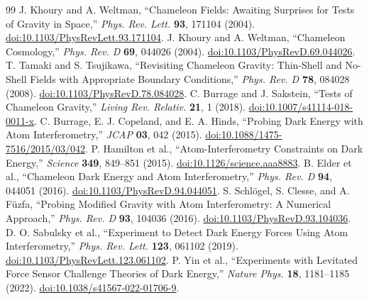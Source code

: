 \begingroup\raggedright
\begin{thebibliography}{99}
 J. Khoury and A. Weltman,
``Chameleon Fields: Awaiting Surprises for Tests of Gravity in Space,''
\emph{Phys. Rev. Lett.} \textbf{93}, 171104 (2004).
\href{https://doi.org/10.1103/PhysRevLett.93.171104}{doi:10.1103/PhysRevLett.93.171104}.
 J. Khoury and A. Weltman, ``Chameleon Cosmology,''
\emph{Phys. Rev. D} \textbf{69}, 044026 (2004).
\href{https://doi.org/10.1103/PhysRevD.69.044026}{doi:10.1103/PhysRevD.69.044026}.
 T. Tamaki and S. Tsujikawa,
``Revisiting Chameleon Gravity: Thin-Shell and No-Shell Fields with Appropriate Boundary Conditions,''
\emph{Phys. Rev. D} \textbf{78}, 084028 (2008).
\href{https://doi.org/10.1103/PhysRevD.78.084028}{doi:10.1103/PhysRevD.78.084028}.
 C. Burrage and J. Sakstein, ``Tests of Chameleon Gravity,''
\emph{Living Rev. Relativ.} \textbf{21}, 1 (2018).
\href{https://doi.org/10.1007/s41114-018-0011-x}{doi:10.1007/s41114-018-0011-x}.
 C. Burrage, E. J. Copeland, and E. A. Hinds,
``Probing Dark Energy with Atom Interferometry,'' \emph{JCAP} \textbf{03}, 042 (2015).
\href{https://doi.org/10.1088/1475-7516/2015/03/042}{doi:10.1088/1475-7516/2015/03/042}.
 P. Hamilton et al., ``Atom-Interferometry Constraints on Dark Energy,''
\emph{Science} \textbf{349}, 849--851 (2015).
\href{https://doi.org/10.1126/science.aaa8883}{doi:10.1126/science.aaa8883}.
 B. Elder et al., ``Chameleon Dark Energy and Atom Interferometry,''
\emph{Phys. Rev. D} \textbf{94}, 044051 (2016).
\href{https://doi.org/10.1103/PhysRevD.94.044051}{doi:10.1103/PhysRevD.94.044051}.
 S. Schl\"ogel, S. Clesse, and A. F\"uzfa,
``Probing Modified Gravity with Atom Interferometry: A Numerical Approach,''
\emph{Phys. Rev. D} \textbf{93}, 104036 (2016).
\href{https://doi.org/10.1103/PhysRevD.93.104036}{doi:10.1103/PhysRevD.93.104036}.
 D. O. Sabulsky et al.,
``Experiment to Detect Dark Energy Forces Using Atom Interferometry,''
\emph{Phys. Rev. Lett.} \textbf{123}, 061102 (2019).
\href{https://doi.org/10.1103/PhysRevLett.123.061102}{doi:10.1103/PhysRevLett.123.061102}.
 P. Yin et al.,
``Experiments with Levitated Force Sensor Challenge Theories of Dark Energy,''
\emph{Nature Phys.} \textbf{18}, 1181--1185 (2022).
\href{https://doi.org/10.1038/s41567-022-01706-9}{doi:10.1038/s41567-022-01706-9}.
\end{thebibliography}
\endgroup
